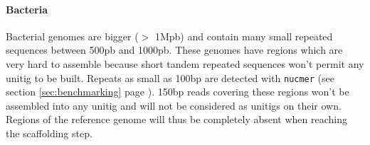 \documentclass[12pt]{article}
\newcommand*{\fulleref}[1]{section \hyperref[{#1}] {\ref*{#1}} page {\pageref{#1}}}%
\begin{document}
\paragraph*{Bacteria}
Bacterial genomes are bigger ($>$ 1Mpb) and contain many small repeated sequences between 500pb and 1000pb. These genomes have regions which are very hard to assemble because short tandem repeated  sequences won't permit any unitig to be built. Repeats as small as 100bp are detected with \texttt{nucmer} (see \fulleref{sec:benchmarking}). 150bp reads covering these regions won't be assembled into any unitig and will not be considered as unitigs on their own. Regions of the reference genome will thus be completely absent when reaching the scaffolding step.
\begin{figure}[h!]
\begin{center}
\end{center}
\end{figure}
\end{document}
